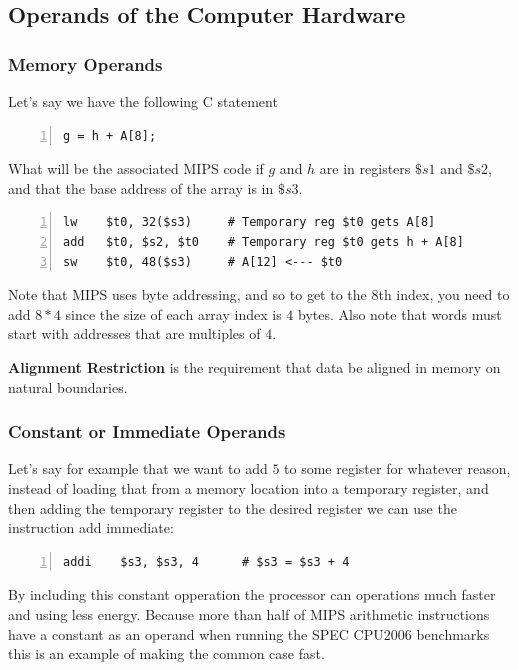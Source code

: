 \documentclass[10pt]{article}
\begin{document}
\subsection{Operands of the Computer Hardware}\label{subsec:}
\subsubsection{Memory Operands}
Let's say we have the following C statement
\begin{lstlisting}[style=CStyle, numbers=left, xleftmargin=5.0ex, aboveskip=2em, belowskip=2em, numberstyle=\color{blue}, escapeinside=||]
g = h + A[8];
\end{lstlisting}
What will be the associated MIPS code if $g$ and $h$ are in registers $\$s1$ and $\$s2$, and that the base address of the array is in $\$s3$.
\begin{lstlisting}[style=CStyle, numbers=left, xleftmargin=5.0ex, aboveskip=2em, belowskip=2em, numberstyle=\color{blue}, escapeinside=||]
lw    $t0, 32($s3)     # Temporary reg $t0 gets A[8]
add   $t0, $s2, $t0    # Temporary reg $t0 gets h + A[8]
sw    $t0, 48($s3)     # A[12] <--- $t0
\end{lstlisting}
Note that MIPS uses byte addressing, and so to get to the $8$th index, you need to add $8*4$ since the size of each array index is $4$ bytes.  Also note that words must start with addresses that are multiples of $4$.
\begin{marginfigure}
\textbf{Alignment Restriction} is the requirement that data be aligned in memory on natural boundaries.
\end{marginfigure}%

\subsubsection{Constant or Immediate Operands}
Let's say for example that we want to add $5$ to some register for whatever reason, instead of loading that from a memory location into a temporary register, and then adding the temporary register to the desired register we can use the instruction add immediate:
\begin{lstlisting}[style=CStyle, numbers=left, xleftmargin=5.0ex, aboveskip=2em, belowskip=2em, numberstyle=\color{blue}, escapeinside=||]
addi    $s3, $s3, 4      # $s3 = $s3 + 4
\end{lstlisting}
By including this constant opperation the processor can operations much faster and using less energy.  Because more than half of MIPS arithmetic instructions have a constant as an operand when running the SPEC CPU2006 benchmarks this is an example of making the common case fast.  
\end{document}
